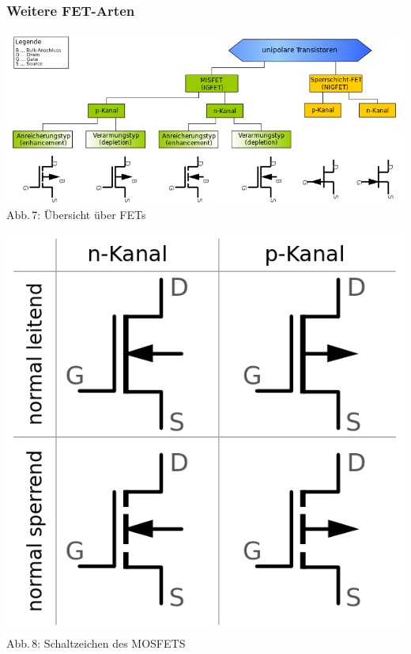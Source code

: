 \begin{frame}
  \frametitle{Weitere FET-Arten}
  \begin{center}
    \includegraphics[width=\textwidth,height=.8\textheight,keepaspectratio]{a06/FET-overview.png}\\
    {\tiny Abb.\,7: Übersicht über FETs~\cite{wp}}
  \end{center}
\end{frame}

\begin{frame}
  \begin{center}
    \includegraphics[width=\textwidth,height=.85\textheight,keepaspectratio]{a06/MOSFET-Symbole.png}\\
    {\tiny Abb.\,8: Schaltzeichen des MOSFETS~\cite{wmde}}
  \end{center}
\end{frame}

